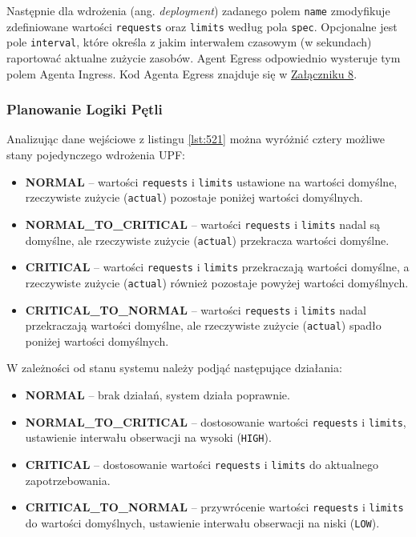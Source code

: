 Następnie dla wdrożenia (ang. \textit{deployment}) zadanego polem \texttt{name} zmodyfikuje zdefiniowane wartości \texttt{requests} oraz \texttt{limits} według pola \texttt{spec}. Opcjonalne jest pole \texttt{interval}, które określa z jakim interwałem czasowym (w sekundach) raportować aktualne zużycie zasobów. Agent Egress odpowiednio wysteruje tym polem Agenta Ingress. Kod Agenta Egress znajduje się w \hyperlink{appendix:8}{Załączniku 8}.

\subsubsection{Planowanie Logiki Pętli}

Analizując dane wejściowe z listingu \ref{lst:521} można wyróżnić cztery możliwe stany pojedynczego wdrożenia UPF:
\begin{itemize}
    \item \textbf{NORMAL} – wartości \texttt{requests} i \texttt{limits} ustawione na wartości domyślne, rzeczywiste zużycie (\texttt{actual}) pozostaje poniżej wartości domyślnych.
    \item \textbf{NORMAL\_TO\_CRITICAL} – wartości \texttt{requests} i \texttt{limits} nadal są domyślne, ale rzeczywiste zużycie (\texttt{actual}) przekracza wartości domyślne.
    \item \textbf{CRITICAL} – wartości \texttt{requests} i \texttt{limits} przekraczają wartości domyślne, a rzeczywiste zużycie (\texttt{actual}) również pozostaje powyżej wartości domyślnych.
    \item \textbf{CRITICAL\_TO\_NORMAL} – wartości \texttt{requests} i \texttt{limits} nadal przekraczają wartości domyślne, ale rzeczywiste zużycie (\texttt{actual}) spadło poniżej wartości domyślnych.
\end{itemize}

W zależności od stanu systemu należy podjąć następujące działania:
\begin{itemize}
    \item \textbf{NORMAL} – brak działań, system działa poprawnie.
    \item \textbf{NORMAL\_TO\_CRITICAL} – dostosowanie wartości \texttt{requests} i \texttt{limits}, ustawienie interwału obserwacji na wysoki (\texttt{HIGH}).
    \item \textbf{CRITICAL} – dostosowanie wartości \texttt{requests} i \texttt{limits} do aktualnego zapotrzebowania.
    \item \textbf{CRITICAL\_TO\_NORMAL} – przywrócenie wartości \texttt{requests} i \texttt{limits} do wartości domyślnych, ustawienie interwału obserwacji na niski (\texttt{LOW}).
\end{itemize}

